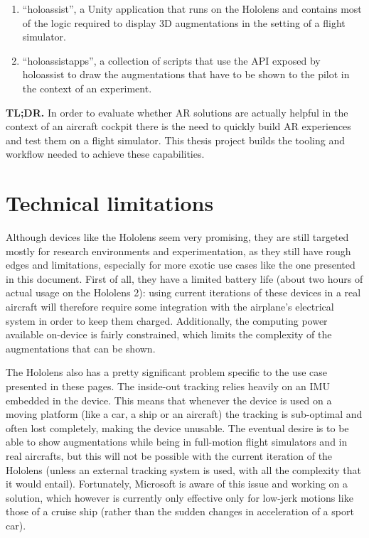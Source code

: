 \begin{enumerate}
    \item \enquote{\gls{holoassist}}, a Unity application that runs on the Hololens and contains most of the logic required to display 3D augmentations in the setting of a flight simulator. 
    \item \enquote{\glspl{holoassistapp}}, a collection of scripts that use the \gls{API} exposed by \gls{holoassist} to draw the augmentations that have to be shown to the pilot in the context of an experiment.
\end{enumerate}

\textbf{TL;DR.} In order to evaluate whether \gls{AR} solutions are actually helpful in the context of an aircraft cockpit there is the need to quickly build \gls{AR} experiences and test them on a flight simulator. This thesis project builds the tooling and workflow needed to achieve these capabilities.

\section{Technical limitations}
Although devices like the Hololens seem very promising, they are still targeted mostly for research environments and experimentation, as they still have rough edges and limitations, especially for more exotic use cases like the one presented in this document. First of all, they have a limited battery life (about two hours of actual usage on the Hololens 2): using current iterations of these devices in a real aircraft will therefore require some integration with the airplane's electrical system in order to keep them charged. Additionally, the computing power available on-device is fairly constrained, which limits the complexity of the augmentations that can be shown.

The Hololens also has a pretty significant problem specific to the use case presented in these pages. The inside-out tracking relies heavily on an \gls{IMU} embedded in the device. This means that whenever the device is used on a moving platform (like a car, a ship or an aircraft) the tracking is sub-optimal and often lost completely, making the device unusable. The eventual desire is to be able to show augmentations while being in full-motion flight simulators and in real aircrafts, but this will not be possible with the current iteration of the Hololens (unless an external tracking system is used, with all the complexity that it would entail). Fortunately, Microsoft is aware of this issue and working on a solution\cite{microsoft_corporation_hololens_nodate}, which however is currently only effective only for low-jerk motions like those of a cruise ship (rather than the sudden changes in acceleration of a sport car).

